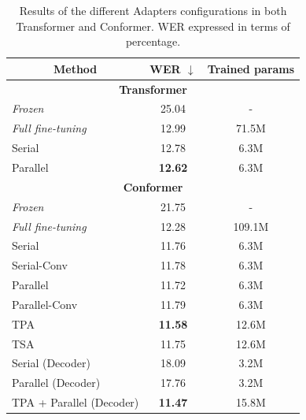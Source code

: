 \begin{table}[h]
\begin{center}    
\begin{tabular}{ccc}
\hline
 Method & WER $\downarrow$     & Trained params    \\ \hline \hline
\multicolumn{3}{c}{\textbf{Transformer}} \\ \hline
\multicolumn{1}{l}{\textit{Frozen}} & 25.04   & - \\
\multicolumn{1}{l}{\textit{Full fine-tuning}} & 12.99 & 71.5M \\ \hline
\multicolumn{1}{l}{Serial}  &   12.78 & 6.3M  \\ 
\multicolumn{1}{l}{Parallel}  &     \textbf{12.62} & 6.3M  \\ \hline\hline
\multicolumn{3}{c}{\textbf{Conformer}} \\ \hline
\multicolumn{1}{l}{\textit{Frozen}} & 21.75   & - \\ 
\multicolumn{1}{l}{\textit{Full fine-tuning}} & 12.28 & 109.1M \\ \hline
\multicolumn{1}{l}{Serial}  &   11.76 & 6.3M  \\ %
\multicolumn{1}{l}{Serial-Conv} & 11.78    & 6.3M  \\
\multicolumn{1}{l}{Parallel}    & 11.72 & 6.3M  \\ %
\multicolumn{1}{l}{Parallel-Conv} & 11.79      & 6.3M  \\ %
\multicolumn{1}{l}{TPA} & \textbf{11.58}     & 12.6M  \\ %
\multicolumn{1}{l}{TSA} & 11.75     & 12.6M  \\ \hline %
\multicolumn{1}{l}{Serial (Decoder)} & 18.09     & 3.2M  \\ 
\multicolumn{1}{l}{Parallel (Decoder)} &17.76     & 3.2M  \\ \hline
\multicolumn{1}{l}{TPA + Parallel (Decoder)} & \textbf{11.47}     & 15.8M  \\ \hline

\end{tabular}
\end{center}
\caption{Results of the different Adapters configurations in both Transformer and Conformer. WER expressed in terms of percentage.}
\label{tab:res_config}
\end{table}

